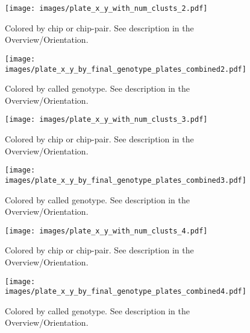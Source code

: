 \documentclass[11pt,landscape]{report}
\begin{document}
\begin{figure}
\texttt{[image: images/plate\_x\_y\_with\_num\_clusts\_2.pdf]}
\caption{Colored by chip or chip-pair. See description in the Overview/Orientation.}
\end{figure}

\begin{figure}
\texttt{[image: images/plate\_x\_y\_by\_final\_genotype\_plates\_combined2.pdf]}
\caption{Colored by called genotype. See description in the Overview/Orientation.}
\end{figure}







\begin{figure}
\texttt{[image: images/plate\_x\_y\_with\_num\_clusts\_3.pdf]}
\caption{Colored by chip or chip-pair. See description in the Overview/Orientation.}
\end{figure}

\begin{figure}
\texttt{[image: images/plate\_x\_y\_by\_final\_genotype\_plates\_combined3.pdf]}
\caption{Colored by called genotype. See description in the Overview/Orientation.}
\end{figure}







\begin{figure}
\texttt{[image: images/plate\_x\_y\_with\_num\_clusts\_4.pdf]}
\caption{Colored by chip or chip-pair. See description in the Overview/Orientation.}
\end{figure}

\begin{figure}
\texttt{[image: images/plate\_x\_y\_by\_final\_genotype\_plates\_combined4.pdf]}
\caption{Colored by called genotype. See description in the Overview/Orientation.}
\end{figure}
\end{document}
